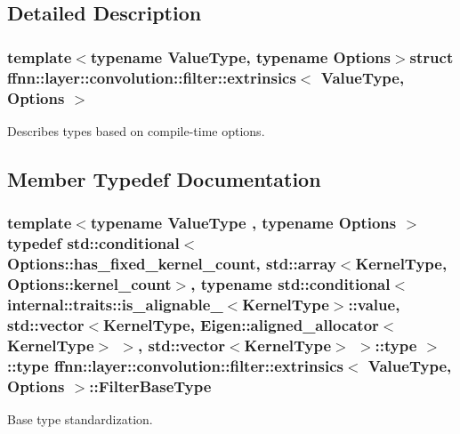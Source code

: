 \subsection{Detailed Description}
\subsubsection*{template$<$typename Value\-Type, typename Options$>$struct ffnn\-::layer\-::convolution\-::filter\-::extrinsics$<$ Value\-Type, Options $>$}

Describes types based on compile-\/time options. 

\subsection{Member Typedef Documentation}
\hypertarget{structffnn_1_1layer_1_1convolution_1_1filter_1_1extrinsics_aa033ddfd5dc48de1253f1071211990e3}{
\subsubsection[{Filter\-Base\-Type}]{\setlength{\rightskip}{0pt plus 5cm}template$<$typename Value\-Type , typename Options $>$ typedef std\-::conditional$<$ Options\-::has\-\_\-fixed\-\_\-kernel\-\_\-count, std\-::array$<${\bf Kernel\-Type}, Options\-::kernel\-\_\-count$>$, typename std\-::conditional$<$ {\bf internal\-::traits\-::is\-\_\-alignable\-\_}$<${\bf Kernel\-Type}$>$\-::value, std\-::vector$<${\bf Kernel\-Type}, Eigen\-::aligned\-\_\-allocator$<${\bf Kernel\-Type}$>$ $>$, std\-::vector$<${\bf Kernel\-Type}$>$ $>$\-::type $>$\-::type {\bf ffnn\-::layer\-::convolution\-::filter\-::extrinsics}$<$ Value\-Type, Options $>$\-::{\bf Filter\-Base\-Type}}}\label{structffnn_1_1layer_1_1convolution_1_1filter_1_1extrinsics_aa033ddfd5dc48de1253f1071211990e3}


Base type standardization. 

